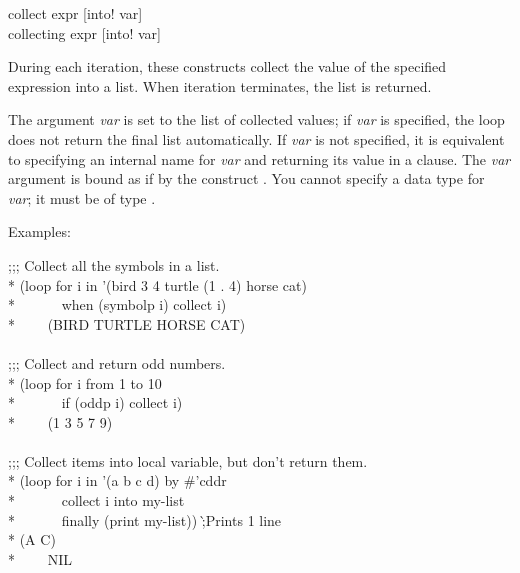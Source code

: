 \begin{defloop}
collect expr [\!into! var] \\
collecting expr [\!into! var]

During each iteration, these constructs collect the value of the specified 
expression into a list. When iteration terminates, the list is returned.

The argument {\it var\/} is 
set to the list of collected values; if {\it var} is specified, the loop
does not return the final list automatically.  If {\it var} is not
specified, it is equivalent to specifying an internal name for
{\it var} and returning its value in a  clause.
The {\it var\/} argument
is bound as if by the construct .
You cannot specify a data type for {\it var\/}; it must be of type .


Examples:
\begin{lisp}
;;; Collect all the symbols in a list. \\*
(loop for i in '(bird 3 4 turtle (1 . 4) horse cat) \\*
~~~~~~when (symbolp i) collect i) \\*
~~~\EV~(BIRD TURTLE HORSE CAT) \\
 \\
;;; Collect and return odd numbers. \\*
(loop for i from 1 to 10 \\*
~~~~~~if (oddp i) collect i) \\*
~~~\EV~(1 3 5 7 9) \\
 \\
;;; Collect items into local variable, but don't return them. \\*
(loop for i in '(a b c d) by \#'cddr \\*
~~~~~~collect i into my-list \\*
~~~~~~finally (print my-list)) \`;{\rm Prints 1 line}\\*
(A C)  \\*
~~~\EV~NIL
\end{lisp}
\end{defloop}

